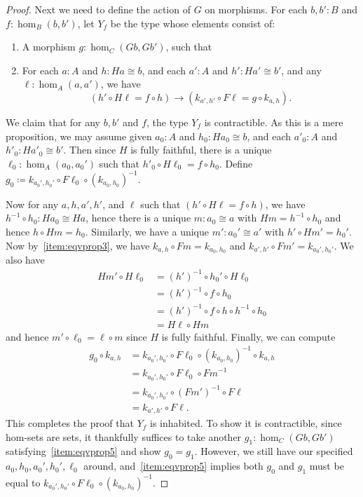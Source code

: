 \documentclass{amsart}
\newcommand{\defeq}{\coloneqq}  %
\theoremstyle{definition}
\theoremstyle{remark}
\numberwithin{equation}{section}
\newcommand{\inv}[1]{{#1}^{-1}}
\begin{document}
\begin{proof}
  Next we need to define the action of $G$ on morphisms.
  For each $b,b':B$ and $f:\hom_B(b,b')$, let $Y_f$ be the type whose elements consist of:
  \begin{enumerate}[resume]
  \item A morphism $g:\hom_C(Gb,Gb')$, such that
  \item For each $a:A$ and $h:Ha\cong b$, and each $a':A$ and $h':Ha'\cong b'$, and any $\ell:\hom_A(a,a')$, we have\label{item:eqvprop5}
    \[ (h' \circ H\ell = f \circ h)
    \to
    (k_{a',h'} \circ F\ell = g\circ k_{a,h}). \]
  \end{enumerate}
  We claim that for any $b,b'$ and $f$, the type $Y_f$ is contractible.
  As this is a mere proposition, we may assume given $a_0:A$ and $h_0:Ha_0\cong b$, and each $a'_0:A$ and $h'_0:Ha'_0\cong b'$.
  Then since $H$ is fully faithful, there is a unique $\ell_0:\hom_A(a_0,a_0')$ such that $h'_0 \circ H\ell_0 = f \circ h_0$.
  Define $g_0 \defeq k_{a_0',h_0'} \circ F \ell_0 \circ \inv{(k_{a_0,h_0})}$.

  Now for any $a,h,a',h'$, and $\ell$ such that $(h' \circ H\ell = f \circ h)$, we have $\inv{h}\circ h_0:Ha_0\cong Ha$, hence there is a unique $m:a_0\cong a$ with $Hm = \inv{h}\circ h_0$ and hence $h\circ Hm = h_0$.
  Similarly, we have a unique $m':a_0'\cong a'$ with $h'\circ Hm' = h_0'$.
  Now by~\ref{item:eqvprop3}, we have $k_{a,h}\circ Fm = k_{a_0,h_0}$ and $k_{a',h'}\circ Fm' = k_{a_0',h_0'}$.
  We also have
  \begin{align*}
    Hm' \circ H\ell_0
    &= \inv{(h')} \circ h_0' \circ H\ell_0\\
    &= \inv{(h')} \circ f \circ h_0\\
    &= \inv{(h')} \circ f \circ h \circ \inv{h} \circ h_0\\
    &= H\ell \circ Hm
  \end{align*}
  and hence $m'\circ \ell_0 = \ell\circ m$ since $H$ is fully faithful.
  Finally, we can compute
  \begin{align*}
    g_0 \circ k_{a,h}
    &= k_{a_0',h_0'} \circ F \ell_0 \circ \inv{(k_{a_0,h_0})} \circ k_{a,h}\\
    &= k_{a_0',h_0'} \circ F \ell_0 \circ \inv{Fm}\\
    &= k_{a_0',h_0'} \circ \inv{(Fm')} \circ F\ell\\
    &= k_{a',h'}\circ F\ell.
  \end{align*}
  This completes the proof that $Y_f$ is inhabited.
  To show it is contractible, since hom-sets are sets, it thankfully suffices to take another $g_1:\hom_C(Gb,Gb')$ satisfying~\ref{item:eqvprop5} and show $g_0=g_1$.
  However, we still have our specified $a_0,h_0,a_0',h_0',\ell_0$ around, and~\ref{item:eqvprop5} implies both $g_0$ and $g_1$ must be equal to $k_{a_0',h_0'} \circ F \ell_0 \circ \inv{(k_{a_0,h_0})}$.


\end{proof}
\end{document}
